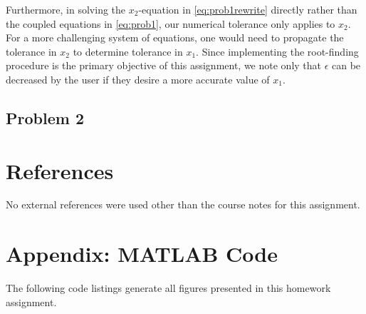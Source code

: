 \documentclass[12pt]{article}
\begin{document}
Furthermore, in solving the $x_2$-equation in \eqref{eq:prob1rewrite} directly rather than the coupled equations in \eqref{eq:prob1}, our numerical tolerance only applies to $x_2$. For a more challenging system of equations, one would need to propagate the tolerance in $x_2$ to determine tolerance in $x_1$. Since implementing the root-finding procedure is the primary objective of this assignment, we note only that $\epsilon$ can be decreased by the user if they desire a more accurate value of $x_1$.

\subsection{Problem 2}

\section{References} %

No external references were used other than the course notes for this assignment.

\section*{Appendix: MATLAB Code} %

The following code listings generate all figures presented in this homework assignment.


\end{document}
